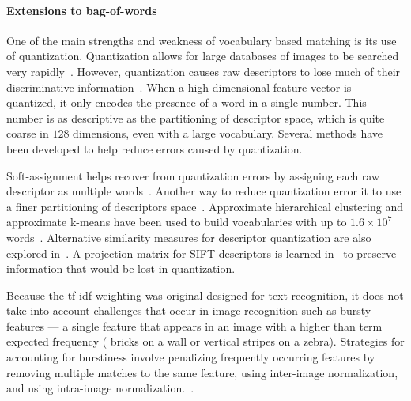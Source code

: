         \paragraph{Extensions to bag-of-words}
            One of the main strengths and weakness of vocabulary based
              matching is its use of quantization.
            Quantization allows for large databases of images to be
              searched very rapidly~\cite{nister_scalable_2006}.
            However, quantization causes raw descriptors to lose much
              of their discriminative
              information~\cite{philbin_lost_2008, boiman_defense_2008}.
            When a high-dimensional feature vector is quantized, it
              only encodes the presence of a word in a single number.
            This number is as descriptive as the partitioning of
              descriptor space, which is quite coarse in $128$
              dimensions, even with a large vocabulary.
            Several methods have been developed to help reduce errors
              caused by quantization.

            Soft-assignment helps recover from quantization errors by
              assigning each raw descriptor as multiple
              words~\cite{philbin_lost_2008}.
            Another way to reduce quantization error it to use a finer
              partitioning of descriptors
              space~\cite{philbin_object_2007}.
            Approximate hierarchical clustering and approximate k-means
              have been used to build vocabularies with up to $1.6 \times
              10^7$ words~\cite{nister_scalable_2006,
              philbin_object_2007, mikulik_learning_2010}.
            Alternative similarity measures for descriptor quantization
              are also explored in~\cite{mikulik_learning_2010}.
            A projection matrix for SIFT descriptors is learned
              in~\cite{philbin_descriptor_2010} to preserve information
              that would be lost in quantization.

            Because the tf-idf weighting was original designed for text
              recognition, it does not take into account challenges that
              occur in image recognition such as bursty features --- a
              single feature that appears in an image with a higher than
              term expected frequency (\eg{} bricks on a wall or vertical
              stripes on a zebra).
            Strategies for accounting for burstiness involve penalizing
              frequently occurring features by removing multiple matches
              to the same feature, using inter-image normalization, and
              using intra-image
              normalization.~\cite{jegou_burstiness_2009}.
            
